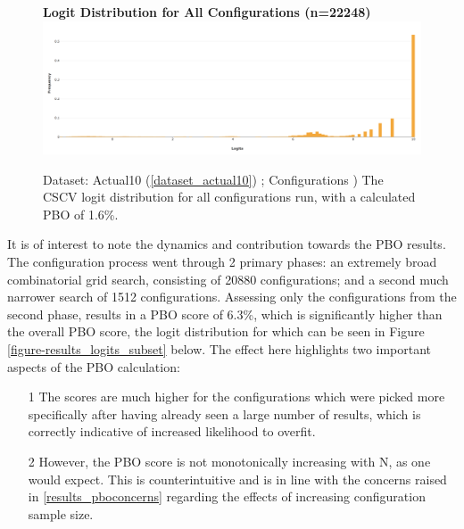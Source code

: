 \documentclass[a4paper,11pt,oneside]{article}
\theoremstyle{plain}
\theoremstyle{definition}
\begin{document}

\begin{figure}[H]
	\centering 
	\textbf{Logit Distribution for All Configurations (n=22248)}
	\includegraphics[scale=0.25]{images/results/pbo/all_sets_dist.png} 
	\caption[Logit Distribution for All Configurations]{Dataset: Actual10 (\ref{dataset_actual10}) ; Configurations )
		\newline The CSCV logit distribution for all configurations run, with a calculated PBO of 1.6\%.}
	\label{figure-results_logits_all}
\end{figure}


It is of interest to note the dynamics and contribution towards the PBO results. The configuration process went through 2 primary phases: an extremely broad combinatorial grid search, consisting of 20880 configurations; and a second much narrower search of 1512 configurations. Assessing only the configurations from the second phase, results in a PBO score of 6.3\%, which is significantly higher than the overall PBO score, the logit distribution for which can be seen in Figure \ref{figure-results_logits_subset} below. The effect here highlights two important aspects of the PBO calculation:
\begin{itemize}
	\item[1] The scores are much higher for the configurations which were picked more specifically after having already seen a large number of results, which is correctly indicative of increased likelihood to overfit.
	\item[2] However, the PBO score is not monotonically increasing with N, as one would expect. This is counterintuitive and is in line with the concerns raised in \ref{results_pboconcerns} regarding the effects of increasing configuration sample size.
\end{itemize}
\end{document}
